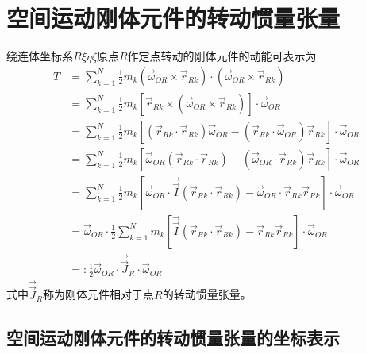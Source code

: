 \section{空间运动刚体元件的转动惯量张量}

绕连体坐标系$R\xi\eta\zeta$原点$R$作定点转动的刚体元件的动能可表示为
\begin{align}
T &= \sum_{k=1}^{N} \frac{1}{2}m_k(\vec{\omega}_{OR} \times \vec{r}_{Rk})\cdot(\vec{\omega}_{OR} \times \vec{r}_{Rk}) \nonumber\\
&= \sum_{k=1}^{N} \frac{1}{2}m_k[\vec{r}_{Rk} \times (\vec{\omega}_{OR} \times \vec{r}_{Rk})]\cdot\vec{\omega}_{OR} \nonumber\\
&= \sum_{k=1}^{N} \frac{1}{2}m_k[(\vec{r}_{Rk}\cdot\vec{r}_{Rk})\vec{\omega}_{OR} - (\vec{r}_{Rk}\cdot\vec{\omega}_{OR})\vec{r}_{Rk}]\cdot\vec{\omega}_{OR} \nonumber\\
&= \sum_{k=1}^{N} \frac{1}{2}m_k[\vec{\omega}_{OR}(\vec{r}_{Rk}\cdot\vec{r}_{Rk}) - (\vec{\omega}_{OR}\cdot\vec{r}_{Rk})\vec{r}_{Rk}]\cdot\vec{\omega}_{OR} \nonumber\\
&= \sum_{k=1}^{N} \frac{1}{2}m_k[\vec{\omega}_{OR}\cdot\vec{\vec{I}}(\vec{r}_{Rk}\cdot\vec{r}_{Rk}) - \vec{\omega}_{OR}\cdot\vec{r}_{Rk}\vec{r}_{Rk}]\cdot\vec{\omega}_{OR} \nonumber\\
&= \vec{\omega}_{OR}\cdot\frac{1}{2}\sum_{k=1}^{N} m_k[\vec{\vec{I}}(\vec{r}_{Rk}\cdot\vec{r}_{Rk}) - \vec{r}_{Rk}\vec{r}_{Rk}]\cdot\vec{\omega}_{OR} \nonumber\\
&=: \frac{1}{2}\vec{\omega}_{OR}\cdot\vec{\vec{J}}_R\cdot\vec{\omega}_{OR}
\label{eq:8.11}
\end{align}
式中$\vec{\vec{J}}_R$称为刚体元件相对于点$R$的转动惯量张量。

\subsection*{空间运动刚体元件的转动惯量张量的坐标表示}

